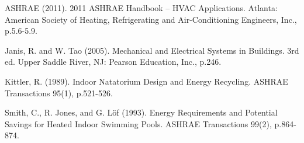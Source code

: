ASHRAE (2011). 2011 ASHRAE Handbook -- HVAC Applications. Atlanta: American Society of Heating, Refrigerating and Air-Conditioning Engineers, Inc., p.5.6-5.9.

Janis, R. and W. Tao (2005). Mechanical and Electrical Systems in Buildings. 3rd ed. Upper Saddle River, NJ: Pearson Education, Inc., p.246.

Kittler, R. (1989). Indoor Natatorium Design and Energy Recycling. ASHRAE Transactions 95(1), p.521-526.

Smith, C., R. Jones, and G. Löf (1993). Energy Requirements and Potential Savings for Heated Indoor Swimming Pools. ASHRAE Transactions 99(2), p.864-874.
